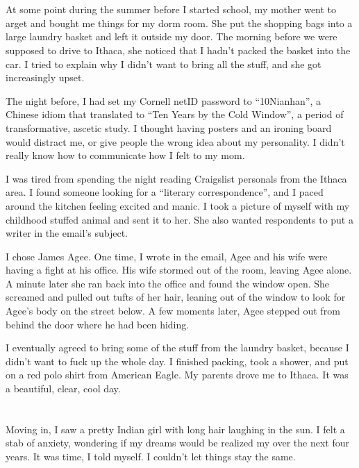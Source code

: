 \section{}
At some point during the summer before I started school, my mother went to
arget and bought me things for my dorm room.  She put the shopping bags into a
large laundry basket and left it outside my door.  The morning before we were
supposed to drive to Ithaca, she noticed that I hadn't packed the basket into
the car.  I tried to explain why I didn't want to bring all the stuff, and she
got increasingly upset.

The night before, I had set my Cornell netID password to ``10Nianhan'', a
Chinese idiom that translated to ``Ten Years by the Cold Window'', a period of
transformative, ascetic study.  I thought having posters and an ironing board
would distract me, or give people the wrong idea about my personality.  I didn't
really know how to communicate how I felt to my mom.

I was tired from spending the night reading Craigslist personals from the Ithaca
area.  I found someone looking for a ``literary correspondence'', and I paced
around the kitchen feeling excited and manic.  I took a picture of myself with
my childhood stuffed animal and sent it to her.  She also wanted respondents to
put a writer in the email's subject.

I chose James Agee.  One time, I wrote in the email, Agee and his wife were
having a fight at his office.  His wife stormed out of the room, leaving Agee
alone.  A minute later she ran back into the office and found the window open.
She screamed and pulled out tufts of her hair, leaning out of the window to look
for Agee's body on the street below.  A few moments later, Agee stepped out from
behind the door where he had been hiding.

I eventually agreed to bring some of the stuff from the laundry basket, because
I didn't want to fuck up the whole day.  I finished packing, took a shower, and
put on a red polo shirt from American Eagle.  My parents drove me to Ithaca.  It
was a beautiful, clear, cool day.  

\section{}

Moving in, I saw a pretty Indian girl with long hair laughing in the sun.  I
felt a stab of anxiety, wondering if my dreams would be realized my over the
next four years.  It was time, I told myself.  I couldn't let things stay the
same.

